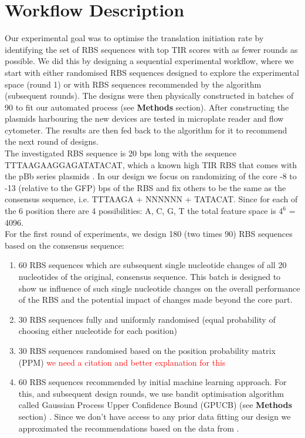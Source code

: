 \documentclass{article}
\begin{document}


\section{Workflow Description}

Our experimental goal was to optimise the translation initiation rate by identifying the set of RBS sequences with top TIR scores with as fewer rounds as possible. We did this by designing a sequential experimental workflow, where we start with either randomised RBS sequences designed to explore the experimental space (round 1) or with RBS sequences recommended by the algorithm (subsequent rounds). The designs were then physically constructed in batches of 90 to fit our automated process (see \textbf{Methods} section). After constructing the plasmids harbouring the new devices are tested in microplate reader and flow cytometer. The results are then fed back to the algorithm for it to recommend the next round of designs.\\
The investigated RBS sequence is 20 bps long with the sequence TTTAAGAAGGAGATATACAT, which a known high TIR RBS that comes with the pBb series plasmids \cite{Lee2011}. In our design we focus on randomizing of the core -8 to -13 (relative to the GFP) bps of the RBS and fix others to be the same as the consensus sequence, i.e. TTTAAGA + NNNNNN + TATACAT. Since for each of the 6 position there are 4 possibilities: A, C, G, T the total feature space is $4^6$ = 4096.\\
For the first round of experiments, we design 180 (two times 90) RBS sequences based on the consensus sequence: 

\begin{enumerate}
    \item 60 RBS sequences which are subsequent single nucleotide changes of all 20 nucleotides of the original, consensus sequence. This batch is designed to show us influence of such single nucleotide changes on the overall performance of the RBS and the potential impact of changes made beyond the core part.
    \item 30 RBS sequences fully and uniformly randomised (equal probability of choosing either nucleotide for each position) 
    \item 30 RBS sequences randomised based on the position probability matrix (PPM) \textcolor{red}{we need a citation and better explanation for this}  
    \item 60 RBS sequences recommended by initial machine learning approach. For this, and subsequent design rounds, we use bandit optimisation algorithm called Gaussian Process Upper Confidence Bound (GPUCB) (see \textbf{Methods} section) \cite{srinivas2012information}. Since we don't have access to any prior data fitting our design we approximated the recommendations based on the data from \textcite{jervis2018machine}. 
\end{enumerate}{}
\end{document}

